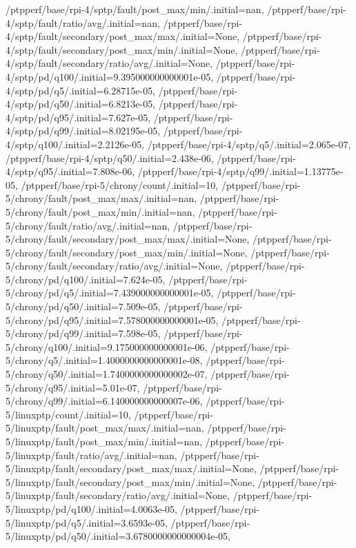 {    /ptpperf/base/rpi-4/sptp/fault/post_max/min/.initial=nan,
    /ptpperf/base/rpi-4/sptp/fault/ratio/avg/.initial=nan,
    /ptpperf/base/rpi-4/sptp/fault/secondary/post_max/max/.initial=None,
    /ptpperf/base/rpi-4/sptp/fault/secondary/post_max/min/.initial=None,
    /ptpperf/base/rpi-4/sptp/fault/secondary/ratio/avg/.initial=None,
    /ptpperf/base/rpi-4/sptp/pd/q100/.initial=9.395000000000001e-05,
    /ptpperf/base/rpi-4/sptp/pd/q5/.initial=6.28715e-05,
    /ptpperf/base/rpi-4/sptp/pd/q50/.initial=6.8213e-05,
    /ptpperf/base/rpi-4/sptp/pd/q95/.initial=7.627e-05,
    /ptpperf/base/rpi-4/sptp/pd/q99/.initial=8.02195e-05,
    /ptpperf/base/rpi-4/sptp/q100/.initial=2.2126e-05,
    /ptpperf/base/rpi-4/sptp/q5/.initial=2.065e-07,
    /ptpperf/base/rpi-4/sptp/q50/.initial=2.438e-06,
    /ptpperf/base/rpi-4/sptp/q95/.initial=7.808e-06,
    /ptpperf/base/rpi-4/sptp/q99/.initial=1.13775e-05,
    /ptpperf/base/rpi-5/chrony/count/.initial=10,
    /ptpperf/base/rpi-5/chrony/fault/post_max/max/.initial=nan,
    /ptpperf/base/rpi-5/chrony/fault/post_max/min/.initial=nan,
    /ptpperf/base/rpi-5/chrony/fault/ratio/avg/.initial=nan,
    /ptpperf/base/rpi-5/chrony/fault/secondary/post_max/max/.initial=None,
    /ptpperf/base/rpi-5/chrony/fault/secondary/post_max/min/.initial=None,
    /ptpperf/base/rpi-5/chrony/fault/secondary/ratio/avg/.initial=None,
    /ptpperf/base/rpi-5/chrony/pd/q100/.initial=7.624e-05,
    /ptpperf/base/rpi-5/chrony/pd/q5/.initial=7.439000000000001e-05,
    /ptpperf/base/rpi-5/chrony/pd/q50/.initial=7.509e-05,
    /ptpperf/base/rpi-5/chrony/pd/q95/.initial=7.578000000000001e-05,
    /ptpperf/base/rpi-5/chrony/pd/q99/.initial=7.598e-05,
    /ptpperf/base/rpi-5/chrony/q100/.initial=9.175000000000001e-06,
    /ptpperf/base/rpi-5/chrony/q5/.initial=1.4000000000000001e-08,
    /ptpperf/base/rpi-5/chrony/q50/.initial=1.7400000000000002e-07,
    /ptpperf/base/rpi-5/chrony/q95/.initial=5.01e-07,
    /ptpperf/base/rpi-5/chrony/q99/.initial=6.140000000000007e-06,
    /ptpperf/base/rpi-5/linuxptp/count/.initial=10,
    /ptpperf/base/rpi-5/linuxptp/fault/post_max/max/.initial=nan,
    /ptpperf/base/rpi-5/linuxptp/fault/post_max/min/.initial=nan,
    /ptpperf/base/rpi-5/linuxptp/fault/ratio/avg/.initial=nan,
    /ptpperf/base/rpi-5/linuxptp/fault/secondary/post_max/max/.initial=None,
    /ptpperf/base/rpi-5/linuxptp/fault/secondary/post_max/min/.initial=None,
    /ptpperf/base/rpi-5/linuxptp/fault/secondary/ratio/avg/.initial=None,
    /ptpperf/base/rpi-5/linuxptp/pd/q100/.initial=4.0063e-05,
    /ptpperf/base/rpi-5/linuxptp/pd/q5/.initial=3.6593e-05,
    /ptpperf/base/rpi-5/linuxptp/pd/q50/.initial=3.6780000000000004e-05,
}
